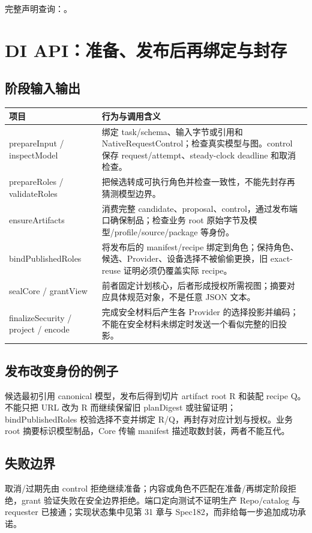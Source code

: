 完整声明查询：。

\section{DI API：准备、发布后再绑定与封存}

\subsection{阶段输入输出}

\begin{longtable}{@{}p{43mm}p{119mm}@{}}
\toprule
项目 & 行为与调用含义 \\
\midrule\endhead
prepareInput / inspectModel & 绑定 task/schema、输入字节或引用和 NativeRequestControl；检查真实模型与图。control 保存 request/attempt、steady-clock deadline 和取消检查。 \\
prepareRoles / validateRoles & 把候选转成可执行角色并检查一致性，不能先封存再猜测模型边界。 \\
ensureArtifacts & 消费完整 candidate、proposal、control，通过发布端口确保制品；检查业务 root 原始字节及模型/profile/source/package 等身份。 \\
bindPublishedRoles & 将发布后的 manifest/recipe 绑定到角色；保持角色、候选、Provider、设备选择不被偷偷更换，旧 exact-reuse 证明必须仍覆盖实际 recipe。 \\
sealCore / grantView & 前者固定计划核心，后者形成授权所需视图；摘要对应具体规范对象，不是任意 JSON 文本。 \\
finalizeSecurity / project / encode & 完成安全材料后产生各 Provider 的选择投影并编码；不能在安全材料未绑定时发送一个看似完整的旧投影。 \\
\bottomrule
\end{longtable}

\subsection{发布改变身份的例子}
候选最初引用 canonical 模型，发布后得到切片 artifact root R 和装配 recipe Q。不能只把 URL 改为 R 而继续保留旧 planDigest 或驻留证明；bindPublishedRoles 校验选择不变并绑定 R/Q，再封存对应计划与授权。业务 root 摘要标识模型制品，Core 传输 manifest 描述取数封装，两者不能互代。

\subsection{失败边界}
取消/过期先由 control 拒绝继续准备；内容或角色不匹配在准备/再绑定阶段拒绝，grant 验证失败在安全边界拒绝。端口定向测试不证明生产 Repo/catalog 与 requester 已接通；实现状态集中见第 31 章与 Spec182，而非给每一步追加成功承诺。

